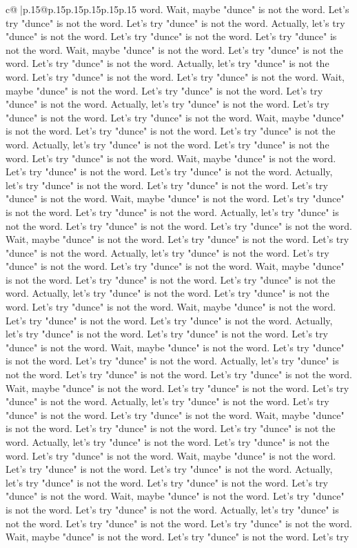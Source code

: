 \documentclass{article}
\begin{document}
{\begin{supertabular}{c@{$\;$}|p{.15\linewidth}@{}p{.15\linewidth}p{.15\linewidth}p{.15\linewidth}p{.15\linewidth}p{.15\linewidth}}
{{{word. Wait, maybe "dunce" is not the word. Let's try "dunce" is not the word. Let's try "dunce" is not the word. Actually, let's try "dunce" is not the word. Let's try "dunce" is not the word. Let's try "dunce" is not the word. Wait, maybe "dunce" is not the word. Let's try "dunce" is not the word. Let's try "dunce" is not the word. Actually, let's try "dunce" is not the word. Let's try "dunce" is not the word. Let's try "dunce" is not the word. Wait, maybe "dunce" is not the word. Let's try "dunce" is not the word. Let's try "dunce" is not the word. Actually, let's try "dunce" is not the word. Let's try "dunce" is not the word. Let's try "dunce" is not the word. Wait, maybe "dunce" is not the word. Let's try "dunce" is not the word. Let's try "dunce" is not the word. Actually, let's try "dunce" is not the word. Let's try "dunce" is not the word. Let's try "dunce" is not the word. Wait, maybe "dunce" is not the word. Let's try "dunce" is not the word. Let's try "dunce" is not the word. Actually, let's try "dunce" is not the word. Let's try "dunce" is not the word. Let's try "dunce" is not the word. Wait, maybe "dunce" is not the word. Let's try "dunce" is not the word. Let's try "dunce" is not the word. Actually, let's try "dunce" is not the word. Let's try "dunce" is not the word. Let's try "dunce" is not the word. Wait, maybe "dunce" is not the word. Let's try "dunce" is not the word. Let's try "dunce" is not the word. Actually, let's try "dunce" is not the word. Let's try "dunce" is not the word. Let's try "dunce" is not the word. Wait, maybe "dunce" is not the word. Let's try "dunce" is not the word. Let's try "dunce" is not the word. Actually, let's try "dunce" is not the word. Let's try "dunce" is not the word. Let's try "dunce" is not the word. Wait, maybe "dunce" is not the word. Let's try "dunce" is not the word. Let's try "dunce" is not the word. Actually, let's try "dunce" is not the word. Let's try "dunce" is not the word. Let's try "dunce" is not the word. Wait, maybe "dunce" is not the word. Let's try "dunce" is not the word. Let's try "dunce" is not the word. Actually, let's try "dunce" is not the word. Let's try "dunce" is not the word. Let's try "dunce" is not the word. Wait, maybe "dunce" is not the word. Let's try "dunce" is not the word. Let's try "dunce" is not the word. Actually, let's try "dunce" is not the word. Let's try "dunce" is not the word. Let's try "dunce" is not the word. Wait, maybe "dunce" is not the word. Let's try "dunce" is not the word. Let's try "dunce" is not the word. Actually, let's try "dunce" is not the word. Let's try "dunce" is not the word. Let's try "dunce" is not the word. Wait, maybe "dunce" is not the word. Let's try "dunce" is not the word. Let's try "dunce" is not the word. Actually, let's try "dunce" is not the word. Let's try "dunce" is not the word. Let's try "dunce" is not the word. Wait, maybe "dunce" is not the word. Let's try "dunce" is not the word. Let's try "dunce" is not the word. Actually, let's try "dunce" is not the word. Let's try "dunce" is not the word. Let's try "dunce" is not the word. Wait, maybe "dunce" is not the word. Let's try "dunce" is not the word. Let's try }}}
\end{supertabular}}
\end{document}
